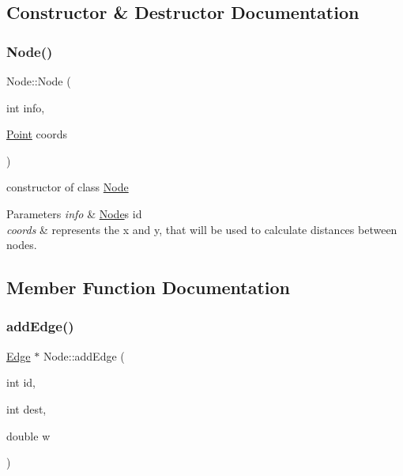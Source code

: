 \subsection{Constructor \& Destructor Documentation}
\mbox{\label{class_node_a81f886219d100c03c66848653c0da654}} 
\subsubsection{\texorpdfstring{Node()}{Node()}}
{\footnotesize\ttfamily Node\+::\+Node (\begin{DoxyParamCaption}\item[{int}]{info,  }\item[{\hyperlink{struct_point}{Point}}]{coords }\end{DoxyParamCaption})}



constructor of class \hyperlink{class_node}{Node} 


\begin{DoxyParams}{Parameters}
{\em info} & \hyperlink{class_node}{Node}\textquotesingle{}s id \\
\hline
{\em coords} & represents the x and y, that will be used to calculate distances between nodes. \\
\hline
\end{DoxyParams}


\subsection{Member Function Documentation}
\mbox{\label{class_node_ac5ca4fd7895f44cf374791717cd239e5}} 
\subsubsection{\texorpdfstring{add\+Edge()}{addEdge()}}
{\footnotesize\ttfamily \hyperlink{class_edge}{Edge} $\ast$ Node\+::add\+Edge (\begin{DoxyParamCaption}\item[{int}]{id,  }\item[{int}]{dest,  }\item[{double}]{w }\end{DoxyParamCaption})}



